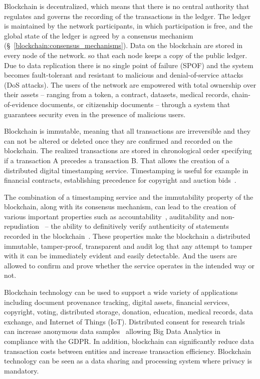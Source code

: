 Blockchain is decentralized, which means that there is no central authority that regulates and governs the recording of the transactions in the ledger. The ledger is maintained by the network participants, in which participation is free, and the global state of the ledger is agreed by a consensus mechanism (§~\ref{blockchain:consensus_mechanisms}). Data on the blockchain are stored in every node of the network. so that each node keeps a copy of the public ledger. Due to data replication there is no single point of failure (SPOF) and the system becomes fault-tolerant and resistant to malicious and denial-of-service attacks (DoS attacks). The users of the network are empowered with total ownership over their assets -- ranging from a token, a contract, datasets, medical records, chain-of-evidence documents, or citizenship documents -- through a system that guarantees security even in the presence of malicious users.

Blockchain is immutable, meaning that all transactions are irreversible and they can not be altered or deleted once they are confirmed and recorded on the blockchain. The realized transactions are stored in chronological order specifying if a transaction A precedes a transaction B. That allows the creation of a distributed digital timestamping service. Timestamping is useful for example in financial contracts, establishing precedence for copyright and auction bids~\cite{bl_auditability}.

The combination of a timestamping service and the immutability property of the blockchain, along with its consensus mechanism, can lead to the creation of various important properties such as accountability~\cite{10.1007/978-3-540-46588-1_20}, auditability and non-repudiation~\cite{non_repudiation} -- the ability
to definitively verify authenticity of statements recorded in the blockchain~\cite{bl_auditability}. These properties make the blockchain a distributed immutable, tamper-proof, transparent and audit log that any attempt to tamper with it can be immediately evident and easily detectable. And the users are allowed to confirm and prove whether the service operates in the intended way or not.

Blockchain technology can be used to support a wide variety of applications including document provenance tracking, digital assets, financial services, copyright, voting, distributed storage, donation, education, medical records, data exchange, and Internet of Things (IoT). Distributed consent for research trials can increase anonymous data samples~\cite{ibm} allowing Big Data Analytics in compliance with the GDPR. In addition, blockchain can significantly reduce data transaction costs between entities and increase transaction efficiency. Blockchain technology can be seen as a data sharing and processing system where privacy is mandatory.


